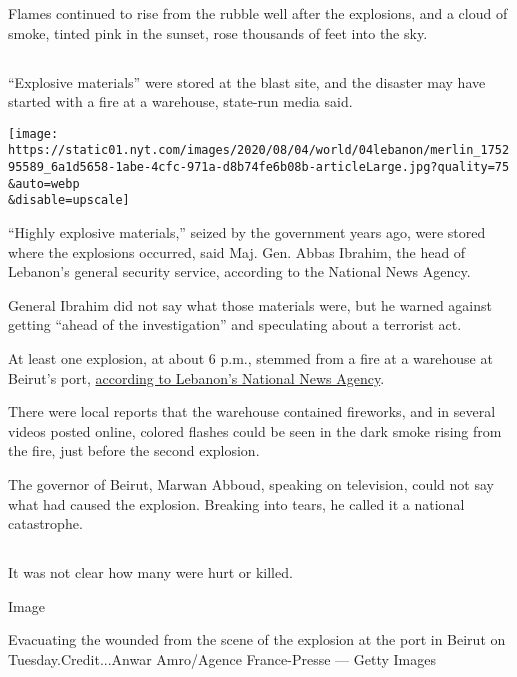 Flames continued to rise from the rubble well after the explosions, and
a cloud of smoke, tinted pink in the sunset, rose thousands of feet into
the sky.

\hypertarget{-1}{%
\subsection{}\label{-1}}

``Explosive materials'' were stored at the blast site, and the disaster
may have started with a fire at a warehouse, state-run media said.

\texttt{[image: https://static01.nyt.com/images/2020/08/04/world/04lebanon/merlin\_175295589\_6a1d5658-1abe-4cfc-971a-d8b74fe6b08b-articleLarge.jpg?quality=75\\\&auto=webp\\\&disable=upscale]}

``Highly explosive materials,'' seized by the government years ago, were
stored where the explosions occurred, said Maj. Gen. Abbas Ibrahim, the
head of Lebanon's general security service, according to the National
News Agency.

General Ibrahim did not say what those materials were, but he warned
against getting ``ahead of the investigation'' and speculating about a
terrorist act.

At least one explosion, at about 6 p.m., stemmed from a fire at a
warehouse at Beirut's port,
\href{http://nna-leb.gov.lb/en/show-news/118492/Fire-breaks-out-in-warehouse-at-Port-of-Beirut-causes-major-explosion}{according
to Lebanon's National News Agency}.

There were local reports that the warehouse contained fireworks, and in
several videos posted online, colored flashes could be seen in the dark
smoke rising from the fire, just before the second explosion.

The governor of Beirut, Marwan Abboud, speaking on television, could not
say what had caused the explosion. Breaking into tears, he called it a
national catastrophe.

\hypertarget{-2}{%
\subsection{}\label{-2}}

It was not clear how many were hurt or killed.

Image

Evacuating the wounded from the scene of the explosion at the port in
Beirut on Tuesday.Credit...Anwar Amro/Agence France-Presse --- Getty
Images

